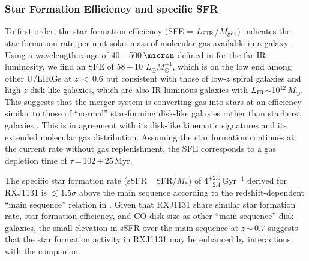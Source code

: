 \documentclass[]{emulateapj}
\newcommand{\Msun}{\mbox{$M_{\odot}$}\xspace}
\newcommand{\Lsun}{\mbox{$L_{\odot}$}\xspace}
\newcommand{\LIR}{\mbox{$L_{\rm IR}$}\xspace}
\newcommand{\LFIR}{\mbox{$L_{\rm FIR}$}\xspace}
\newcommand{\pmOne}{\mbox{$^{-1}$}\xspace}
\newcommand{\petm}[2]{$^{+#1}_{-#2}$}
\newcommand{\eq}{\,=\,}
\newcommand{\ssim}{\,$\sim$\,}
\newcommand{\pmm}{\,$\pm$\,}
\newcommand{\SF}{star formation\xspace}
\begin{document}
\subsubsection{Star Formation Efficiency and specific SFR}

To first order, the star formation efficiency
$($SFE = \LFIR$/$$M_{\rm gas})$ indicates the \SF rate per unit solar mass of molecular gas available in a galaxy.
Using a wavelength range of 40\,$-$\,500\,$\micron$ defined
in  for the far-IR luminosity,
we find an SFE of 58\pmm10 \Lsun $M_{\odot}^{-1}$,
which is on the low end among other U/LIRGs at $z$\,$<$\,0.6
\citep[;][]{Combes11a} but consistent with those of
low-$z$ spiral galaxies  and high-$z$ disk-like
galaxies, which are also IR luminous galaxies with \LIR$\sim$10$^{12}$\,\Msun \citep{Daddi08a, Daddi10a}.
This suggests that the merger system is converting gas into stars at an efficiency
similar to those of ``normal'' star-forming
disk-like galaxies rather than starburst galaxies
\citep[][]{Tacconi08a, Riechers11a}.
This is in agreement with its disk-like kinematic signatures and its extended molecular gas distribution.
Assuming the \SF continues at the current rate without gas replenishment,
the SFE corresponds to a
gas depletion time of $\tau$\,=\,102\pmm25\,Myr.

The specific star formation rate (sSFR\eq SFR/$M_*$) of 4\petm{2.6}{2.4}\,Gyr\pmOne derived for RXJ1131
is $\lesssim$1.5$\sigma$ above the main sequence according to
the redshift-dependent ``main sequence'' relation in \citet[and references therein]{Tacconi13a}.
Given that RXJ1131 share similar \SF rate, \SF efficiency, and CO disk size as other ``main sequence'' disk galaxies,
the small elevation in sSFR over the main sequence at $z$\ssim0.7 suggests
that the \SF activity in RXJ1131 may be enhanced by interactions with the companion.
\end{document}
